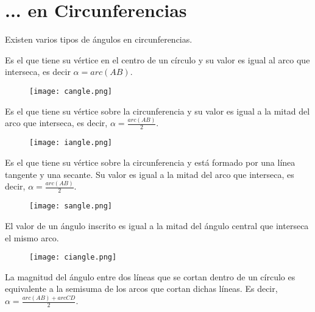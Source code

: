 \section{... en Circunferencias}

Existen varios tipos de ángulos en circunferencias.

\begin{definition}
    Es el que tiene su vértice en el centro de un círculo y su 
    valor es igual al arco que interseca, es decir 
    $\alpha = arc(AB).$ 
\end{definition}

\begin{figure}[h]
    \centering
    \texttt{[image: cangle.png]}
\end{figure}

\begin{definition}
    Es el que tiene su vértice sobre la circunferencia y su valor 
    es igual a la mitad del arco que interseca, es decir, 
    $\alpha = \frac{arc(AB)}{2}.$
\end{definition}

\begin{figure}[h]
    \centering
    \texttt{[image: iangle.png]}
\end{figure}

\begin{definition}
    Es el que tiene su vértice sobre la circunferencia y está 
    formado por una línea tangente y una secante. Su valor es igual 
    a la mitad del arco que interseca, es decir, 
    $\alpha = \frac{arc(AB)}{2}.$
\end{definition}

\begin{figure}[h]
    \centering
    \texttt{[image: sangle.png]}
\end{figure}

\begin{theorem}
    El valor de un ángulo inscrito es igual a la mitad del ángulo 
    central que interseca el mismo arco.
\end{theorem}

\begin{figure}[h]
    \centering
    \texttt{[image: ciangle.png]}
\end{figure}

\begin{theorem}
    La magnitud del ángulo entre dos líneas que se cortan dentro
    de un círculo es equivalente a la semisuma de los arcos que 
    cortan dichas líneas. Es decir, 
    $\alpha = \frac{arc(AB)+arc{CD}}{2}.$
\end{theorem}

